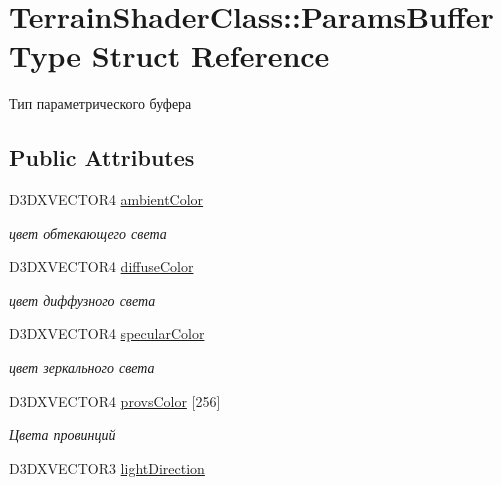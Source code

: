 \hypertarget{struct_terrain_shader_class_1_1_params_buffer_type}{}\section{Terrain\+Shader\+Class\+:\+:Params\+Buffer\+Type Struct Reference}
\label{struct_terrain_shader_class_1_1_params_buffer_type}


Тип параметрического буфера  


\subsection*{Public Attributes}
\begin{DoxyCompactItemize}
\item 
D3\+D\+X\+V\+E\+C\+T\+O\+R4 \hyperlink{struct_terrain_shader_class_1_1_params_buffer_type_a29ba93988854866baf2ae8a16212e12f}{ambient\+Color}
\begin{DoxyCompactList}\small\item\em цвет обтекающего света \end{DoxyCompactList}\item 
D3\+D\+X\+V\+E\+C\+T\+O\+R4 \hyperlink{struct_terrain_shader_class_1_1_params_buffer_type_a00166120829a2a848755c4006d072128}{diffuse\+Color}
\begin{DoxyCompactList}\small\item\em цвет диффузного света \end{DoxyCompactList}\item 
D3\+D\+X\+V\+E\+C\+T\+O\+R4 \hyperlink{struct_terrain_shader_class_1_1_params_buffer_type_aa8595f0e1ff9a8ef666a6f9e895f2a39}{specular\+Color}
\begin{DoxyCompactList}\small\item\em цвет зеркального света \end{DoxyCompactList}\item 
D3\+D\+X\+V\+E\+C\+T\+O\+R4 \hyperlink{struct_terrain_shader_class_1_1_params_buffer_type_ae9e4001df2fcd7398d404829f9941183}{provs\+Color} \mbox{[}256\mbox{]}
\begin{DoxyCompactList}\small\item\em Цвета провинций \end{DoxyCompactList}\item 
D3\+D\+X\+V\+E\+C\+T\+O\+R3 \hyperlink{struct_terrain_shader_class_1_1_params_buffer_type_a9205832479b21aee049a054478038bf4}{light\+Direction}

\end{DoxyCompactItemize}

